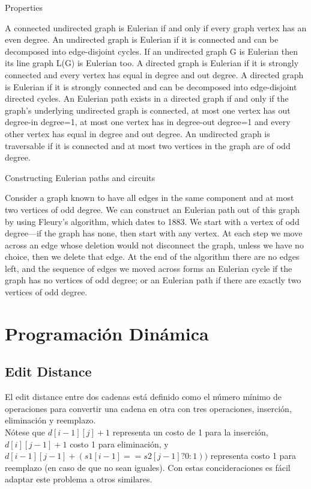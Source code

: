 \documentclass[10pt,letterpaper,twocolumn,twosided]{article}
\begin{document}
Properties

A connected undirected graph is Eulerian if and only if every graph vertex has an even degree.
An undirected graph is Eulerian if it is connected and can be decomposed into edge-disjoint cycles.
If an undirected graph G is Eulerian then its line graph L(G) is Eulerian too.
A directed graph is Eulerian if it is strongly connected and every vertex has equal in degree and out degree.
A directed graph is Eulerian if it is strongly connected and can be decomposed into edge-disjoint directed cycles.
An Eulerian path exists in a directed graph if and only if the graph's underlying undirected graph is connected, at most one vertex has out degree-in degree=1, at most one vertex has in degree-out degree=1 and every other vertex has equal in degree and out degree.
An undirected graph is traversable if it is connected and at most two vertices in the graph are of odd degree.

Constructing Eulerian paths and circuits

Consider a graph known to have all edges in the same component and at most two vertices of odd degree. We can construct an Eulerian path out of this graph by using Fleury's algorithm, which dates to 1883. We start with a vertex of odd degree—if the graph has none, then start with any vertex. At each step we move across an edge whose deletion would not disconnect the graph, unless we have no choice, then we delete that edge. At the end of the algorithm there are no edges left, and the sequence of edges we moved across forms an Eulerian cycle if the graph has no vertices of odd degree; or an Eulerian path if there are exactly two vertices of odd degree.

\section{Programación Dinámica}

\subsection{Edit Distance}

El edit distance entre dos cadenas está definido como el número mínimo de operaciones para convertir una cadena en otra
con tres operaciones, inserción, eliminación y reemplazo.\\
Nótese que $d[i - 1][j] + 1$ representa un costo de 1 para la inserción, $d[i][j - 1] + 1$ costo 1 para eliminación, y $d[i - 1][j - 1] + (s1[i - 1] == s2[j - 1] ? 0 : 1))$ representa costo 1 para reemplazo (en caso de que no sean iguales). Con estas concideraciones es fácil adaptar este problema a otros similares.
\end{document}

